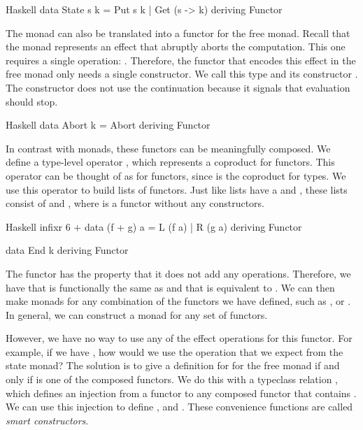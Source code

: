 \begin{lst}{Haskell}
data State s k = Put s k | Get (s -> k)
  deriving Functor
\end{lst}

The  monad can also be translated into a functor for the free monad. Recall that the  monad represents an effect that abruptly aborts the computation. This one requires a single operation: . Therefore, the functor that encodes this effect in the free monad only needs a single constructor. We call this type and its constructor . The  constructor does not use the continuation because it signals that evaluation should stop.

\begin{lst}{Haskell}
data Abort k = Abort
  deriving Functor
\end{lst}

\noindent In contrast with monads, these functors can be meaningfully composed. We define a type-level operator \hs{+}, which represents a coproduct for functors. This operator can be thought of as  for functors, since  is the coproduct for types. We use this operator to build lists of functors. Just like lists have a  and , these lists consist of \hs{+} and , where  is a functor without any constructors.

\begin{lst}{Haskell}
infixr 6 +
data (f + g) a = L (f a) | R (g a)
  deriving Functor

data End k
  deriving Functor
\end{lst}

\noindent The  functor has the property that it does not add any operations. Therefore, we have that
 is functionally the same as  and that  is equivalent to . We can then make monads for any combination of the functors we have defined, such as ,  or . In general, we can construct a monad for any set of functors.

However, we have no way to use any of the effect operations for this functor. For example, if we have , how would we use the  operation that we expect from the state monad? The solution is to give a definition for  for the free monad if and only if  is one of the composed functors. We do this with a typeclass relation \hs{<}, which defines an injection from a functor  to any composed functor  that contains . We can use this injection to define ,  and . These convenience functions are called \emph{smart constructors}.

